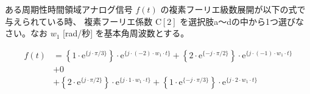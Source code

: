 ある周期性時間領域アナログ信号 $f(t)$ の複素フーリエ級数展開が以下の式で与えられている時、
複素フーリエ係数 $\textrm{C}[2]$ を選択肢a〜dの中から1つ選びなさい。なお $w_1$ [rad/秒] を基本角周波数とする。

\begin{align*}
f(t) 
&= \left \{ 1 \cdot \textrm{e}^{\{ j \cdot \pi/3 \}} \right \} \cdot \textrm{e}^{\{ j \cdot (-2) \cdot w_1 \cdot t \}} 
 + \left \{ 2 \cdot \textrm{e}^{\{-j \cdot \pi/2 \}} \right \} \cdot \textrm{e}^{\{ j \cdot (-1) \cdot w_1 \cdot t \}} \\
&+ 0 \\
&+ \left \{ 2 \cdot \textrm{e}^{\{ j \cdot \pi/2 \}} \right \} \cdot \textrm{e}^{\{ j \cdot    1 \cdot w_1 \cdot t \}} 
 + \left \{ 1 \cdot \textrm{e}^{\{-j \cdot \pi/3 \}} \right \} \cdot \textrm{e}^{\{ j \cdot    2 \cdot w_1 \cdot t \}} 
\end{align*}
